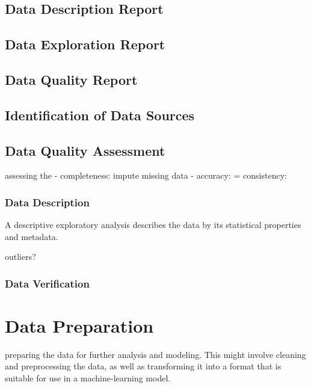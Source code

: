 \documentclass[
  american,
  10,
  a4paper,
]{book}
\theoremstyle{definition}
\theoremstyle{remark}
\begin{document}
\section{Data Description Report}\label{data-description-report}

\section{Data Exploration Report}\label{data-exploration-report}

\section{Data Quality Report}\label{data-quality-report}

\section{Identification of Data
Sources}\label{identification-of-data-sources}

\section{Data Quality Assessment}\label{data-quality-assessment}

assessing the - completeness: impute missing data - accuracy: =
consistency:

\subsection{Data Description}\label{data-description}

A descriptive exploratory analysis describes the data by its statistical
properties and metadata.

outliers?

\subsection{Data Verification}\label{data-verification}

\chapter{Data Preparation}\label{data-preparation}

preparing the data for further analysis and modeling. This might involve
cleaning and preprocessing the data, as well as transforming it into a
format that is suitable for use in a machine-learning model.
\end{document}

